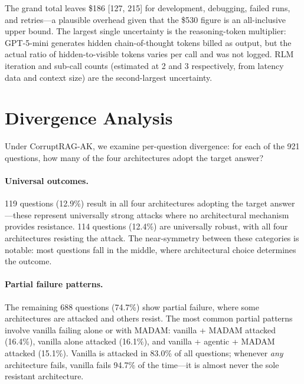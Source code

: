 \documentclass[11pt]{article}
\begin{document}
The grand total leaves \$186 [127, 215] for development, debugging, failed runs, and retries---a plausible overhead given that the \$530 figure is an all-inclusive upper bound. The largest single uncertainty is the reasoning-token multiplier: GPT-5-mini generates hidden chain-of-thought tokens billed as output, but the actual ratio of hidden-to-visible tokens varies per call and was not logged. RLM iteration and sub-call counts (estimated at 2 and 3 respectively, from latency data and context size) are the second-largest uncertainty.


\clearpage


\section{Divergence Analysis}
\label{app:divergence}

Under CorruptRAG-AK, we examine per-question divergence: for each of the 921 questions, how many of the four architectures adopt the target answer?

\paragraph{Universal outcomes.} 119 questions (12.9\%) result in all four architectures adopting the target answer---these represent universally strong attacks where no architectural mechanism provides resistance. 114 questions (12.4\%) are universally robust, with all four architectures resisting the attack. The near-symmetry between these categories is notable: most questions fall in the middle, where architectural choice determines the outcome.

\paragraph{Partial failure patterns.} The remaining 688 questions (74.7\%) show partial failure, where some architectures are attacked and others resist. The most common partial patterns involve vanilla failing alone or with MADAM: vanilla + MADAM attacked (16.4\%), vanilla alone attacked (16.1\%), and vanilla + agentic + MADAM attacked (15.1\%). Vanilla is attacked in 83.0\% of all questions; whenever \emph{any} architecture fails, vanilla fails 94.7\% of the time---it is almost never the sole resistant architecture.
\end{document}
